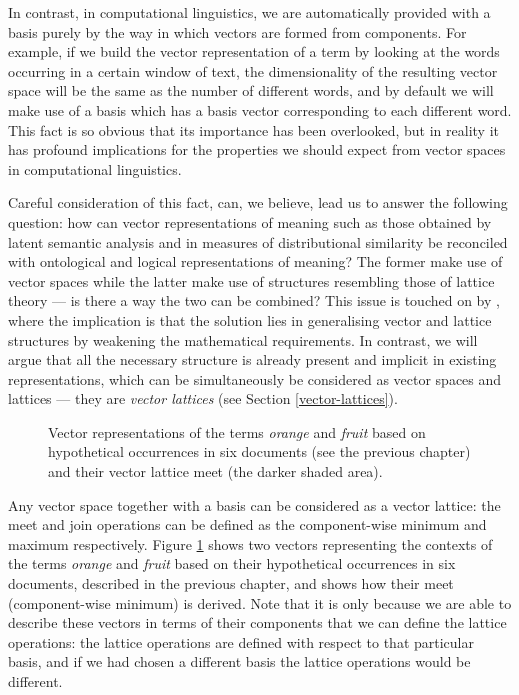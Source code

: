 In contrast, in computational linguistics, we are automatically provided with a basis purely by the way in which vectors are formed from components. For example, if we build the vector representation of a term by looking at the words occurring in a certain window of text, the dimensionality of the resulting vector space will be the same as the number of different words, and by default we will make use of a basis which has a basis vector corresponding to each different word. This fact is so obvious that its importance has been overlooked, but in reality it has profound implications for the properties we should expect from vector spaces in computational linguistics.

Careful consideration of this fact, can, we believe, lead us to answer the following question: how can vector representations of meaning such as those obtained by latent semantic analysis and in measures of distributional similarity be reconciled with ontological and logical representations of meaning? The former make use of vector spaces while the latter make use of structures resembling those of lattice theory --- is there a way the two can be combined? This issue is touched on by \cite{Widdows:04}, where the implication is that the solution lies in generalising vector and lattice structures by weakening the mathematical requirements. In contrast, we will argue that all the necessary structure is already present and implicit in existing representations, which can be simultaneously be considered as vector spaces and lattices --- they are \emph{vector lattices} (see Section \ref{vector-lattices}).

\begin{figure}
\begin{center}

\caption{Vector representations of the terms \emph{orange} and \emph{fruit} based on hypothetical occurrences in six documents (see the previous chapter) and their vector lattice meet (the darker shaded area).}
\label{orangefruit}
\end{center}
\end{figure}

Any vector space together with a basis can be considered as a vector lattice: the meet and join operations can be defined as the component-wise minimum and maximum respectively. Figure \ref{orangefruit} shows two vectors representing the contexts of the terms \emph{orange} and \emph{fruit} based on their hypothetical occurrences in six documents, described in the previous chapter, and shows how their meet (component-wise minimum) is derived. Note that it is only because we are able to describe these vectors in terms of their components that we can define the lattice operations: the lattice operations are defined with respect to that particular basis, and if we had chosen a different basis the lattice operations would be different.


